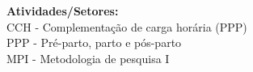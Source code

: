 {\fontsize{10pt}{12pt}\selectfont
\noindent
\textbf{Atividades/Setores:}\\
CCH - Complementação de carga horária (PPP)\\
PPP - Pré-parto, parto e pós-parto\\
MPI - Metodologia de pesquisa I
}